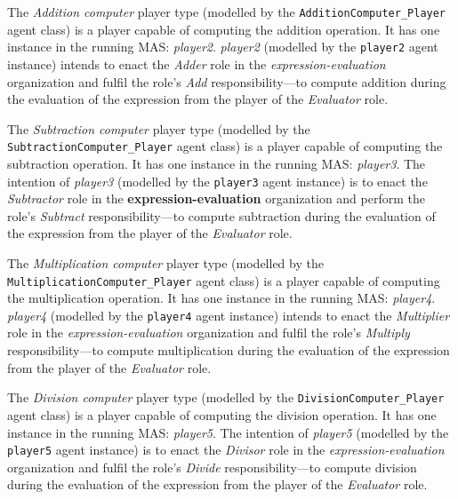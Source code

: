 The \textit{Addition computer} player type (modelled by the \texttt{AdditionComputer\_Player} agent class) is a player capable of computing the addition operation.
It has one instance in the running MAS: \textit{player2}.
\textit{player2} (modelled by the \texttt{player2} agent instance) intends to enact the \textit{Adder} role in the \textit{expression-evaluation} organization and fulfil the role's \textit{Add} responsibility---to compute addition during the evaluation of the expression from the player of the \textit{Evaluator} role.

The \textit{Subtraction computer} player type (modelled by the \texttt{SubtractionComputer\_Player} agent class) is a player capable of computing the subtraction operation.
It has one instance in the running MAS: \textit{player3}.
The intention of \textit{player3} (modelled by the \texttt{player3} agent instance) is to enact the \textit{Subtractor} role in the \textbf{expression-evaluation} organization and perform the role's \textit{Subtract} responsibility---to compute subtraction during the evaluation of the expression from the player of the  \textit{Evaluator} role.

The \textit{Multiplication computer} player type (modelled by the \texttt{MultiplicationComputer\_Player} agent class) is a player capable of computing the multiplication operation.
It has one instance in the running MAS: \textit{player4}.
\textit{player4} (modelled by the \texttt{player4} agent instance) intends to enact the \textit{Multiplier} role in the \textit{expression-evaluation} organization and fulfil the role's \textit{Multiply} responsibility---to compute multiplication during the evaluation of the expression from the player of the \textit{Evaluator} role.

The \textit{Division computer} player type (modelled by the \texttt{DivisionComputer\_Player} agent class) is a player capable of computing the division operation.
It has one instance in the running MAS: \textit{player5}.
The intention of \textit{player5} (modelled by the \texttt{player5} agent instance) is to enact the \textit{Divisor} role in the \textit{expression-evaluation} organization and fulfil the role's \textit{Divide} responsibility---to compute division during the evaluation of the expression from the player of the \textit{Evaluator} role.

